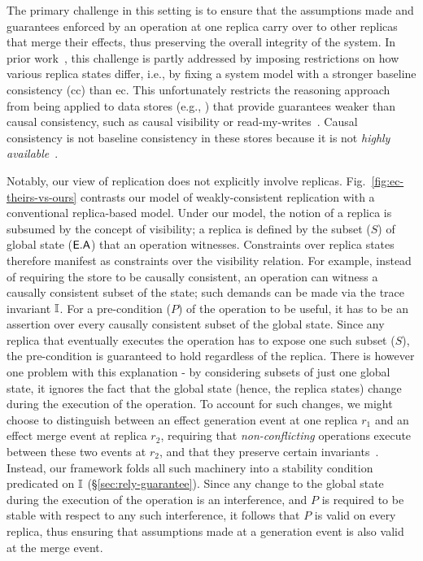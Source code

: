 The primary challenge in this setting is to ensure that the
assumptions made and guarantees enforced by an operation at one
replica carry over to other replicas that merge their effects, thus
preserving the overall integrity of the system.  In prior
work~\cite{lbc16,gotsmanpopl16}, this challenge is partly addressed by
imposing restrictions on how various replica states differ, i.e., by
fixing a system model with a stronger baseline consistency ({\sc cc})
than {\sc ec}. This unfortunately restricts the reasoning approach
from being applied to data stores (e.g., \cite{bayou,pldi15}) that
provide guarantees weaker than causal consistency, such as causal
visibility or read-my-writes~\cite{zoo}. Causal consistency is not
baseline consistency in these stores because it is not \emph{highly
  available}~\cite{bailishat}.

Notably, our view of replication does not explicitly involve replicas.
Fig.~\ref{fig:ec-theirs-vs-ours} contrasts our model of
weakly-consistent replication with a conventional replica-based model.
Under our model, the notion of a replica is subsumed by the concept of
visibility; a replica is defined by the subset ($S$) of global state
($\textsf{E}.\textsf{A}$) that an operation witnesses. Constraints over replica states
therefore manifest as constraints over the visibility relation.  For
example, instead of requiring the store to be causally consistent, an
operation can witness a causally consistent subset of the state; such
demands can be made via the trace invariant $\mathbb{I}$. For a pre-condition
($P$) of the operation to be useful, it has to be an assertion over
every causally consistent subset of the global state.  Since any
replica that eventually executes the operation has to expose one such
subset ($S$), the pre-condition is guaranteed to hold regardless of
the replica. There is however one problem with this explanation - by
considering subsets of just one global state, it ignores the fact that
the global state (hence, the replica states) change during the
execution of the operation. To account for such changes, we might
choose to distinguish between an effect generation event at one
replica $r_1$ and an effect merge event at replica $r_2$, requiring
that \emph{non-conflicting} operations execute between these two
events at $r_2$, and that they preserve certain
invariants~\cite{gotsmanpopl16}.  Instead, our framework folds all
such machinery into a stability condition predicated on $\mathbb{I}$
(\S\ref{sec:rely-guarantee}).  Since any change to the global state
during the execution of the operation is an interference, and $P$ is
required to be stable with respect to any such interference, it
follows that $P$ is valid on every replica, thus ensuring that
assumptions made at a generation event is also valid at the merge
event.

